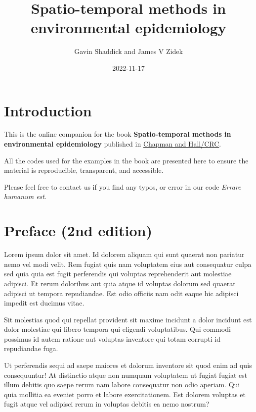 \documentclass[
]{book}
\title{Spatio-temporal methods in environmental epidemiology}
\author{Gavin Shaddick and James V Zidek}
\date{2022-11-17}
\begin{document}
\maketitle

{
\setcounter{tocdepth}{1}
\tableofcontents
}
\hypertarget{introduction}{%
\chapter*{Introduction}\label{introduction}}

This is the online companion for the book \textbf{Spatio-temporal methods in environmental epidemiology} published in \href{https://www.taylorfrancis.com/books/mono/10.1201/b18600/spatio-temporal-methods-environmental-epidemiology-gavin-shaddick-james-zidek}{Chapman and Hall/CRC}.

All the codes used for the examples in the book are presented here to ensure the material is reproducible, transparent, and accessible.

Please feel free to contact us if you find any typos, or error in our code \emph{Errare humanum est}.

\hypertarget{preface-2nd-edition}{%
\chapter*{Preface (2nd edition)}\label{preface-2nd-edition}}

Lorem ipsum dolor sit amet. Id dolorem aliquam qui sunt quaerat non pariatur nemo vel modi velit. Rem fugiat quis nam voluptatem eius aut consequatur culpa sed quia quia est fugit perferendis qui voluptas reprehenderit aut molestiae adipisci. Et rerum doloribus aut quia atque id voluptas dolorum sed quaerat adipisci ut tempora repudiandae. Est odio officiis nam odit eaque hic adipisci impedit est ducimus vitae.

Sit molestias quod qui repellat provident sit maxime incidunt a dolor incidunt est dolor molestiae qui libero tempora qui eligendi voluptatibus. Qui commodi possimus id autem ratione aut voluptas inventore qui totam corrupti id repudiandae fuga.

Ut perferendis sequi ad saepe maiores et dolorum inventore sit quod enim ad quis consequuntur! At distinctio atque non numquam voluptatem ut fugiat fugiat est illum debitis quo saepe rerum nam labore consequatur non odio aperiam. Qui quia mollitia ea eveniet porro et labore exercitationem. Est dolorem voluptas et fugit atque vel adipisci rerum in voluptas debitis ea nemo nostrum?
\end{document}

